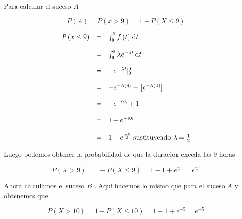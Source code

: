\documentclass{article}
\begin{document}
\begin{flushleft}
        Para calcular el suceso $A$ 

        \begin{equation*}
            P\left(A \right) = P \left(x > 9 \right) = 1 - P \left(X \le 9 \right)
        \end{equation*}

        \begin{equation*}
            \begin{array}{rcl}
                P \left(x \le 9 \right) &  =  & \int_{0}^{9} f\left(t\right) \,\mathrm{d}t 
                \\
                \\
                                        &  =  & \int_{0}^{9} \lambda e^{- \lambda t}  \,\mathrm{d}t 
                \\
                \\
                                        &  =  & - e ^{-\lambda t } |_{0}^{9} 
                \\
                \\
                                        & = & -e^{- \lambda \left(9\right)} - \left[e^{-  \lambda \left(0\right) }\right]
                \\
                \\
                                        & = & -e^{-9 \lambda} + 1   
                \\
                \\
                                        & = & 1 - e^{-9 \lambda}   
                \\
                \\
                                        & = & 1 - e^{\frac{-9}{2}}  \mbox{ sustituyendo  $ \lambda = \frac{1}{2}$}
            \end{array}
        \end{equation*}

        Luego podemos obtener la probabilidad de que la duracion exceda las 9 horas 
        
        \begin{equation*}
            P \left(X > 9 \right) = 1 -  P \left(X \le 9 \right)  = 1 - 1 + e^{\frac{-9}{2}} = e^{\frac{-9}{2}}
        \end{equation*}

        Ahora calculamos el suceso $B$ . Aqui hacemos lo mismo que para el suceso $A$ y obtenemos que 

        \begin{equation*}
            P \left(X > 10 \right) = 1 -  P \left(X \le 10 \right)  = 1 - 1 + e^{-5} = e^{-5}
        \end{equation*}


\end{flushleft}
\end{document}
